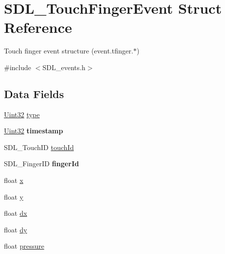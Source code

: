 \hypertarget{struct_s_d_l___touch_finger_event}{}\section{S\+D\+L\+\_\+\+Touch\+Finger\+Event Struct Reference}
\label{struct_s_d_l___touch_finger_event}


Touch finger event structure (event.\+tfinger.$\ast$)  




{\ttfamily \#include $<$S\+D\+L\+\_\+events.\+h$>$}

\subsection*{Data Fields}
\begin{DoxyCompactItemize}
\item 
\hyperlink{_s_d_l__stdinc_8h_add440eff171ea5f55cb00c4a9ab8672d}{Uint32} \hyperlink{struct_s_d_l___touch_finger_event_aa40a9b05c3154032b9f2d7220e9f08dc}{type}
\item 
\hyperlink{_s_d_l__stdinc_8h_add440eff171ea5f55cb00c4a9ab8672d}{Uint32} {\bfseries timestamp}\hypertarget{struct_s_d_l___touch_finger_event_abf1ed7edeab81db9c05d899836a44a2f}{}\label{struct_s_d_l___touch_finger_event_abf1ed7edeab81db9c05d899836a44a2f}

\item 
S\+D\+L\+\_\+\+Touch\+ID \hyperlink{struct_s_d_l___touch_finger_event_a35f615f6a1333a7d89297b58ed1e9bbb}{touch\+Id}
\item 
S\+D\+L\+\_\+\+Finger\+ID {\bfseries finger\+Id}\hypertarget{struct_s_d_l___touch_finger_event_ac3c3601fcd3552c6bc353fadd95a0206}{}\label{struct_s_d_l___touch_finger_event_ac3c3601fcd3552c6bc353fadd95a0206}

\item 
float \hyperlink{struct_s_d_l___touch_finger_event_ad0da36b2558901e21e7a30f6c227a45e}{x}
\item 
float \hyperlink{struct_s_d_l___touch_finger_event_aa4f0d3eebc3c443f9be81bf48561a217}{y}
\item 
float \hyperlink{struct_s_d_l___touch_finger_event_a9eae6c1f38db98ab568f3ed3771a969d}{dx}
\item 
float \hyperlink{struct_s_d_l___touch_finger_event_a8f461b6142ce8725218813abb23b06a3}{dy}
\item 
float \hyperlink{struct_s_d_l___touch_finger_event_ac870e1249bab4a2a68cc4126761d24ef}{pressure}
\end{DoxyCompactItemize}



